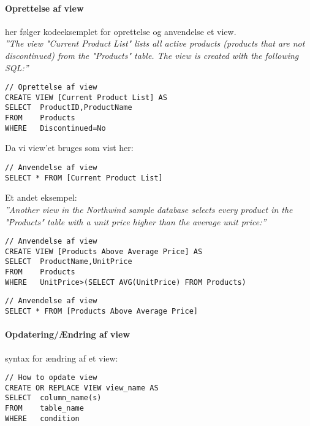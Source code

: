 \paragraph{Oprettelse af view} her følger kodeeksemplet for oprettelse og anvendelse et view. \\

\textit{''The view "Current Product List" lists all active products (products that are not discontinued) from the "Products" table. The view is created with the following SQL:''}

\begin{lstlisting}[caption=Kodeeksempel for oprettelse af View,label=code:view,morekeywords={CREATE, VIEW, AS, SELECT, FROM, WHERE}]
// Oprettelse af view
CREATE VIEW [Current Product List] AS
SELECT 	ProductID,ProductName
FROM 	Products
WHERE 	Discontinued=No
\end{lstlisting}

Da vi view'et bruges som vist her: 

\begin{lstlisting}[caption=Kodeeksempel for anvendelse af View,label=code:view]
// Anvendelse af view
SELECT * FROM [Current Product List]
\end{lstlisting}

Et andet eksempel:\\

\textit{''Another view in the Northwind sample database selects every product in the "Products" table with a unit price higher than the average unit price:''}

\begin{lstlisting}[caption=Et andet kodeeksempel for anvendelse af View,label=code:view]
// Anvendelse af view
CREATE VIEW [Products Above Average Price] AS
SELECT 	ProductName,UnitPrice
FROM 	Products
WHERE 	UnitPrice>(SELECT AVG(UnitPrice) FROM Products)
\end{lstlisting}

\begin{lstlisting}[caption=Kodeeksempel for anvendelse af View,label=code:view]
// Anvendelse af view
SELECT * FROM [Products Above Average Price]
\end{lstlisting}

\paragraph{Opdatering/Ændring af view} syntax for ændring af et view:

\begin{lstlisting}[caption=Opdatering af view]
// How to opdate view
CREATE OR REPLACE VIEW view_name AS
SELECT 	column_name(s)
FROM 	table_name
WHERE 	condition
\end{lstlisting}

